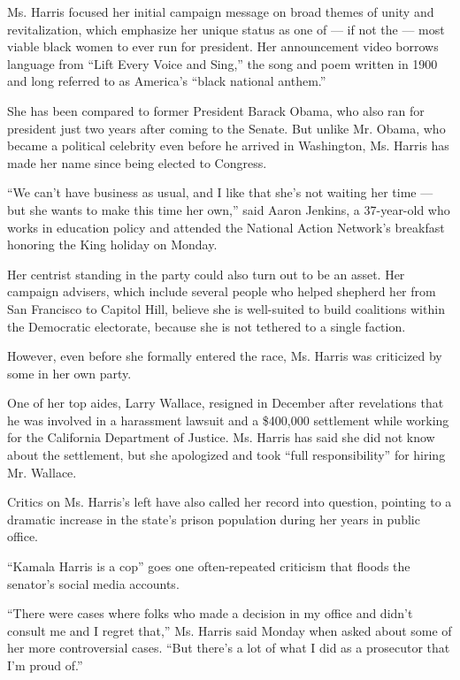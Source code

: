 Ms. Harris focused her initial campaign message on broad themes of unity
and revitalization, which emphasize her unique status as one of --- if
not the --- most viable black women to ever run for president. Her
announcement video borrows language from ``Lift Every Voice and Sing,''
the song and poem written in 1900 and long referred to as America's
``black national anthem.''

She has been compared to former President Barack Obama, who also ran for
president just two years after coming to the Senate. But unlike Mr.
Obama, who became a political celebrity even before he arrived in
Washington, Ms. Harris has made her name since being elected to
Congress.

``We can't have business as usual, and I like that she's not waiting her
time --- but she wants to make this time her own,'' said Aaron Jenkins,
a 37-year-old who works in education policy and attended the National
Action Network's breakfast honoring the King holiday on Monday.

Her centrist standing in the party could also turn out to be an asset.
Her campaign advisers, which include several people who helped shepherd
her from San Francisco to Capitol Hill, believe she is well-suited to
build coalitions within the Democratic electorate, because she is not
tethered to a single faction.

However, even before she formally entered the race, Ms. Harris was
criticized by some in her own party.

One of her top aides, Larry Wallace, resigned in December after
revelations that he was involved in a harassment lawsuit and a \$400,000
settlement while working for the California Department of Justice. Ms.
Harris has said she did not know about the settlement, but she
apologized and took ``full responsibility'' for hiring Mr. Wallace.

Critics on Ms. Harris's left have also called her record into question,
pointing to a dramatic increase in the state's prison population during
her years in public office.

``Kamala Harris is a cop'' goes one often-repeated criticism that floods
the senator's social media accounts.

``There were cases where folks who made a decision in my office and
didn't consult me and I regret that,'' Ms. Harris said Monday when asked
about some of her more controversial cases. ``But there's a lot of what
I did as a prosecutor that I'm proud of.''

